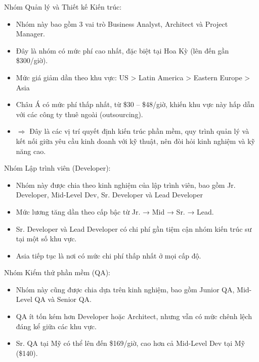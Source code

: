     \begin{flushleft}
      \hspace*{0.8cm}Nhóm Quản lý và Thiết kế Kiến trúc:
      \setlength{\leftmargini}{1.5cm}
      \begin{itemize}
          \item Nhóm này bao gồm 3 vai trò Business Analyst, Architect và Project Manager.
          \item Đây là nhóm có mức phí cao nhất, đặc biệt tại Hoa Kỳ (lên đến gần \$300/giờ).
          \item Mức giá giảm dần theo khu vực: US > Latin America > Eastern Europe > Asia
          \item Châu Á có mức phí thấp nhất, từ \$30 – \$48/giờ, khiến khu vực này hấp dẫn với các công ty thuê ngoài (outsourcing).
          \item[]$\Rightarrow$ Đây là các vị trí quyết định kiến trúc phần mềm, quy trình quản lý và kết nối giữa yêu cầu kinh doanh với kỹ thuật, nên đòi hỏi kinh nghiệm và kỹ năng cao.
      \end{itemize}
    \end{flushleft}

    \begin{flushleft}
      \hspace*{0.8cm}Nhóm Lập trình viên (Developer):
      \setlength{\leftmargini}{1.5cm}
      \begin{itemize}
          \item Nhóm này được chia theo kinh nghiệm của lập trình viên, bao gồm Jr. Developer, Mid-Level Dev, Sr. Developer và Lead Developer
          \item Mức lương tăng dần theo cấp bậc từ Jr. → Mid → Sr. → Lead.
          \item Sr. Developer và Lead Developer có chi phí gần tiệm cận nhóm kiến trúc sư tại một số khu vực.
          \item Asia tiếp tục là nơi có mức chi phí thấp nhất ở mọi cấp độ.
      \end{itemize}
    \end{flushleft}

    \begin{flushleft}
      \hspace*{0.8cm}Nhóm Kiểm thử phần mềm (QA):
      \setlength{\leftmargini}{1.5cm}
      \begin{itemize}
          \item Nhóm này cũng được chia dựa trên kinh nghiệm, bao gồm Junior QA, Mid-Level QA và Senior QA.
          \item QA ít tốn kém hơn Developer hoặc Architect, nhưng vẫn có mức chênh lệch đáng kể giữa các khu vực.
          \item Sr. QA tại Mỹ có thể lên đến \$169/giờ, cao hơn cả Mid-Level Dev tại Mỹ (\$140).
      \end{itemize}
    \end{flushleft}

